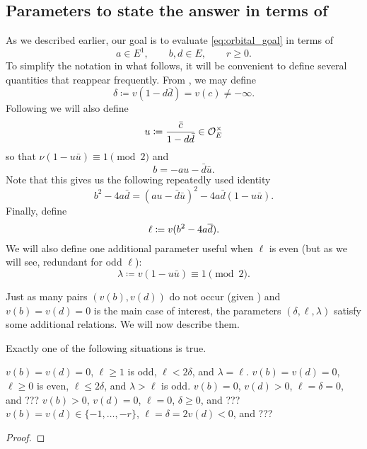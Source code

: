 \subsection{Parameters to state the answer in terms of}
As we described earlier, our goal is to evaluate \eqref{eq:orbital_goal} in terms of
\[ a \in E^1, \qquad b, d \in E, \qquad r \ge 0. \]
To simplify the notation in what follows,
it will be convenient to define several quantities that reappear frequently.
From , we may define
\begin{equation}
  \delta \coloneqq v(1-d \bar d) = v(c) \neq -\infty.
  \label{eq:delta}
\end{equation}
Following \cite{ref:AFL} we will also define
\begin{equation}
  u \coloneqq \frac{\bar c}{1-d \bar d} \in \mathcal O_E^\times
  \label{eq:u}
\end{equation}
so that $\nu(1-u \bar u) \equiv 1 \pmod 2$ and
\begin{equation}
  b = -au - \bar{d} \bar{u}.
  \label{eq:b}
\end{equation}
Note that this gives us the following repeatedly used identity
\begin{equation}
  b^2-4a\bar d = (au-\bar d \bar u)^2 - 4a\bar d(1-u\bar u).
  \label{eq:dos}
\end{equation}
Finally, define
\begin{equation}
  \ell \coloneqq v(b^2 - 4 a \overline d).
  \label{eq:ell}
\end{equation}
We will also define one additional parameter useful when $\ell$ is even
(but as we will see, redundant for odd $\ell$):
\begin{equation}
  \lambda \coloneqq v(1-u \bar u) \equiv 1 \pmod 2.
  \label{eq:lambda}
\end{equation}

Just as many pairs $(v(b), v(d))$ do not occur (given )
and $v(b) = v(d) = 0$ is the main case of interest,
the parameters $(\delta, \ell, \lambda)$ satisfy some additional relations.
We will now describe them.
\begin{proposition}
  Exactly one of the following situations is true.
  \begin{enumerate}[a.]
    \ii $v(b) = v(d) = 0$, $\ell \ge 1$ is odd,
      $\ell < 2 \delta$, and $\lambda = \ell$.
    \ii $v(b) = v(d) = 0$, $\ell \ge 0$ is even,
      $\ell \le 2 \delta$, and $\lambda > \ell$ is odd.
    \ii $v(b) = 0$, $v(d) > 0$, $\ell = \delta = 0$, and ???
    \ii $v(b) > 0$, $v(d) = 0$, $\ell  = 0$, $\delta \ge 0$, and ???
    \ii $v(b) = v(d) \in \{-1, \dots, -r\}$,
    $\ell = \delta = 2v(d) < 0$, and ???
  \end{enumerate}
  \label{prop:parameter_constraints}
\end{proposition}
\begin{proof}
\end{proof}

